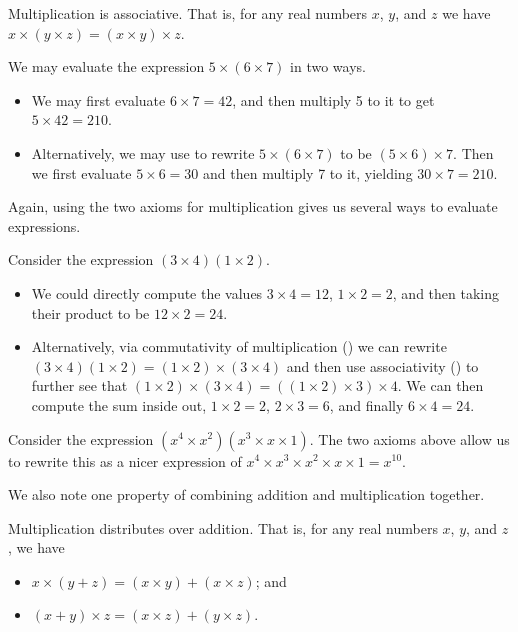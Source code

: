 \begin{axiom}\label{axiom-multiplication-is-associative}
    Multiplication is associative. That is, for any real numbers $x$, $y$, and $z$ we have $x\times(y\times z) = (x\times y)\times z$.
\end{axiom}
\begin{example}
    We may evaluate the expression $5\times(6\times7)$ in two ways.
    \begin{itemize}
        \item We may first evaluate $6\times7 = 42$, and then multiply 5 to it to get $5 \times 42 = 210$.
        \item Alternatively, we may use  to rewrite $5\times(6\times7)$ to be $(5\times6)\times7$. Then we first evaluate $5\times6 = 30$ and then multiply 7 to it, yielding $30\times7 = 210$.
    \end{itemize}
\end{example}

Again, using the two axioms for multiplication gives us several ways to evaluate expressions.
\begin{example}
    Consider the expression $(3\times4)(1\times2)$.
    \begin{itemize}
        \item We could directly compute the values $3 \times 4 = 12$, $1 \times 2 = 2$, and then taking their product to be $12\times2 = 24$.
        \item Alternatively, via commutativity of multiplication () we can rewrite $(3\times4)(1\times2)=(1\times2)\times(3\times4)$ and then use associativity () to further see that $(1\times2)\times(3\times4) = ((1\times2)\times3)\times4$. We can then compute the sum inside out, $1 \times 2 = 2$, $2 \times 3 = 6$, and finally $6 \times 4 = 24$.
    \end{itemize}
\end{example}
\begin{example}
    Consider the expression $(x^4\times x^2)(x^3 \times x \times 1)$. The two axioms above allow us to rewrite this as a nicer expression of $x^4 \times x^3 \times x^2 \times x \times 1 = x^{10}$.
\end{example}

We also note one property of combining addition and multiplication together.

\begin{axiom}\label{axiom-distributivity}
    Multiplication distributes over addition. That is, for any real numbers $x$, $y$, and $z$, we have
    \begin{itemize}
        \item $x\times(y+z) = (x\times y) + (x\times z)$; and
        \item $(x+y)\times z = (x\times z) + (y\times z)$.
    \end{itemize}
\end{axiom}

